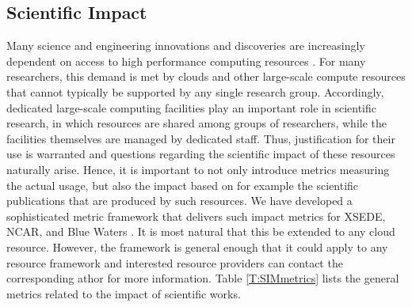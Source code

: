 \documentclass{sig-alternate-05-2015}
\begin{document}

\subsection{Scientific Impact}

Many science and engineering innovations and discoveries are increasingly dependent on access to high performance computing resources \cite{las14Impact,las15xsede,las15cluster}. For many researchers, this demand is met by clouds and other large-scale compute resources that cannot typically be supported by any single research group. Accordingly, dedicated large-scale computing facilities play an important role in scientific research, in which resources are shared among groups of researchers, while the facilities themselves are managed by dedicated staff.  Thus, justification for their use is warranted and questions regarding the scientific impact of these resources naturally arise. Hence, it is important to not only introduce metrics measuring the actual usage, but also the impact based on for example the scientific publications that are produced by such resources. We have developed a sophisticated metric framework that delivers such impact metrics for XSEDE, NCAR, and Blue Waters \cite{las14Impact,las15xsede,las15cluster}. It is most natural that this be extended to any cloud resource. However, the framework is general enough that it could apply to any resource framework and interested resource providers can contact the corresponding athor for more information. Table \ref{T:SIMmetrics} lists the general metrics related to the impact of scientific works.
\end{document}
